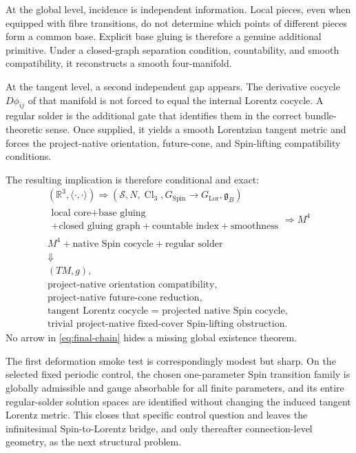 \documentclass[11pt,a4paper]{article}
\theoremstyle{definition}
\theoremstyle{remark}
\newcommand{\R}{\mathbb{R}}
\newcommand{\Smodel}{\mathcal{S}}
\newcommand{\Cl}{\operatorname{Cl}}
\newcommand{\SpinG}{G_{\mathrm{Spin}}}
\newcommand{\LorG}{G_{\mathrm{Lor}}}
\newcommand{\gB}{\mathfrak{g}_{B}}
\begin{document}
At the global level, incidence is independent information.  Local pieces,
even when equipped with fibre transitions, do not determine which points
of different pieces form a common base.  Explicit base gluing is therefore
a genuine additional primitive.  Under a closed-graph separation condition,
countability, and smooth compatibility, it reconstructs a smooth
four-manifold.

At the tangent level, a second independent gap appears.  The derivative
cocycle \(D\phi_{ij}\) of that manifold is not forced to equal the internal
Lorentz cocycle.  A regular solder is the additional gate that identifies
them in the correct bundle-theoretic sense.  Once supplied, it yields a
smooth Lorentzian tangent metric and forces the project-native orientation,
future-cone, and Spin-lifting compatibility conditions.

The resulting implication is therefore conditional and exact:
\[
\begin{array}{c}
(\R^{3},\langle\cdot,\cdot\rangle)
\Longrightarrow
(\Smodel,N,\Cl_{3},\SpinG\!\to\!\LorG,\gB)
\\[0.5em]
\begin{gathered}
\text{local core}+\text{base gluing}\\
+\text{closed gluing graph}+\text{countable index}+\text{smoothness}
\end{gathered}
\Longrightarrow M^{4}
\\[0.5em]
M^{4}+\text{native Spin cocycle}+\text{regular solder}
\\[-0.1em]
\Downarrow
\\[-0.1em]
(TM,g),
\\
\text{project-native orientation compatibility},
\\
\text{project-native future-cone reduction},
\\
\text{tangent Lorentz cocycle = projected native Spin cocycle},
\\
\text{trivial project-native fixed-cover Spin-lifting obstruction}.
\end{array}
\tag{13.1}\label{eq:final-chain}
\]
No arrow in \eqref{eq:final-chain} hides a missing global existence theorem.

The first deformation smoke test is correspondingly modest but sharp.  On
the selected fixed periodic control, the chosen one-parameter Spin
transition family is globally admissible and gauge absorbable for all
finite parameters, and its entire regular-solder solution spaces are
identified without changing the induced tangent Lorentz metric.  This
closes that specific control question and leaves the infinitesimal
Spin-to-Lorentz bridge, and only thereafter connection-level geometry, as
the next structural problem.
\end{document}
